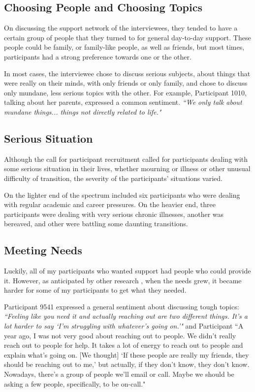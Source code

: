   \subsection{Choosing People and Choosing Topics}
  On discussing the support network of the interviewees,
  they tended to have a certain group of people that they turned to for
  general day-to-day support.
  These people could be family, or family-like people, as well as friends,
  but most times, participants had a strong preference towards one or the other.

  In most cases, the interviewee chose to discuss serious subjects,
  about things that were really on their minds,
  with only friends or only family,
  and chose to discuss only mundane, less serious topics with the other.
  For example, Participant 1010, talking about her parents,
  expressed a common sentiment.
  \textit{
  ``We only talk about mundane things...
  things not directly related to life."
  }

  \subsection{Serious Situation}
  Although the call for participant recruitment called for participants
  dealing with some serious situation in their lives,
  whether mourning or illness or other unusual difficulty of transition,
  the severity of the participants' situations varied.

  On the lighter end of the spectrum included six participants who were
  dealing with regular academic and career pressures.
  On the heavier end,
  three participants were dealing with very serious chronic illnesses,
  another was bereaved, and other were battling some daunting transitions.

  \subsection{Meeting Needs}
  Luckily, all of my participants who wanted support had people
  who could provide it.
  However, as anticipated by other research \cite{skeels10},
  when the needs grew, it became harder for some of my participants to get
  what they needed.

  Participant 9541 expressed a general sentiment about discussing tough topics:
  \textit{
  ``Feeling like you need it and actually reaching out are two different things.
  It's a lot harder to say `I'm struggling with whatever's going on.'"
  } and Participant 
  ``A year ago, I was not very good about reaching out to people.
  We didn't really reach out to people for help.
  It takes a lot of energy to reach out to people and explain what's going on.
  [We thought]
  `If these people are really my friends, they should be reaching out to me,'
  but actually, if they don't know, they don't know.
  Nowadays, there's a group of people we'll email or call.
  Maybe we should be asking a few people, specifically, to be on-call."

